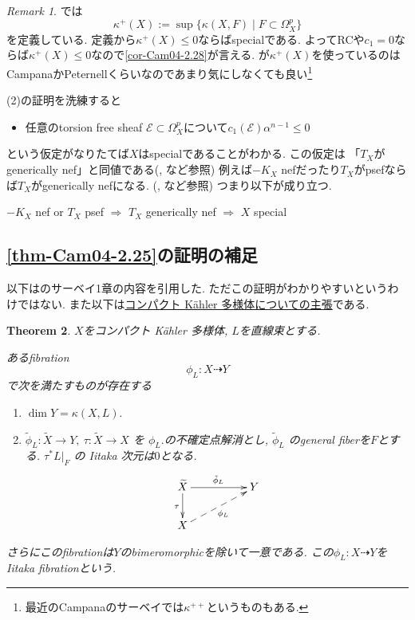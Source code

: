 \documentclass[dvipdfmx,a4paper,11pt]{article} %
\newtheorem{thm}{Theorem}[section]
\theoremstyle{definition}
\theoremstyle{remark}
\newtheorem{rem}[thm]{Remark}
\numberwithin{equation}{section}
\begin{document}
\begin{rem}
\cite{Cam95} では
$$
\kappa^+(X) := \sup\{ \kappa(X, F) \mid F \subset \Omega_X^p\}
$$
を定義している. 定義から$\kappa^+(X) \le 0$ならばspecialである. 
よってRCや$c_1=0$ならば$\kappa^+(X)\leq 0$なので\ref{cor-Cam04-2.28}が言える. 
が$\kappa^{+}(X)$を使っているのはCampanaかPeternellくらいなのであまり気にしなくても良い\footnote{最近のCampanaのサーベイでは$\kappa^{++}$というものもある. }

(2)の証明を洗練すると
\begin{itemize}
\item 任意のtorsion free sheaf $\mathcal{E} \subset \Omega_{X}^{p}$について$c_1(\mathcal{E}) \alpha^{n-1} \le 0$
\end{itemize}
という仮定がなりたてば$X$はspecialであることがわかる.
この仮定は
「$T_X$がgenerically nef」と同値である(\cite{IM22}, \cite{IMZ23}など参照)
例えば$-K_X$ nefだったり$T_X$がpsefならば$T_X$がgenerically nefになる. (\cite{Ou17}, \cite{IMZ23}など参照)
つまり以下が成り立つ. 
\begin{center}
$-K_X$ nef or $T_X$ psef
$\Rightarrow $ $T_X$ generically nef
$\Rightarrow $ $X$ special
\end{center}

\end{rem}


\subsection{\ref{thm-Cam04-2.25}の証明の補足}
以下は\cite{Voi}のサーベイ1章の内容を引用した.
ただこの証明がわかりやすいというわけではない. 
また以下は\underline{コンパクト K\"ahler 多様体についての主張}である. 
\begin{thm}\cite[Theorem 1.7  (Iitaka)]{Voi}
\label{thm-Voi-1.7}
$X$をコンパクト K\"ahler 多様体, $L$を直線束とする. 

あるfibration
\[
\phi_L : X \dashrightarrow Y
\]
で次を満たすものが存在する
\begin{enumerate}
\item \(\dim Y = \kappa(X,L).\)
\item \(\tilde{\phi}_L : \tilde{X} \to Y, \ \tau : \tilde{X} \to X\) を \(\phi_L.\)の不確定点解消とし, \(\tilde{\phi}_L\) のgeneral fiberを$F$とする.  
 \(\tau^*L|_{F}\) の Iitaka 次元は\(0\)となる.
\[
\xymatrix@C=50pt@R=20pt{
\widetilde{X} \ar@{->}[r]^{\tilde{\phi}_L} \ar@{->}[d]_{ \tau} &Y \\
X \ar@{-->}[ru]_{\phi_L} & 
}
\]
\end{enumerate}
さらにこのfibrationは$Y$のbimeromorphicを除いて一意である.
この$\phi_L : X \dashrightarrow Y$をIitaka fibrationという. 
\end{thm}
\end{document}
